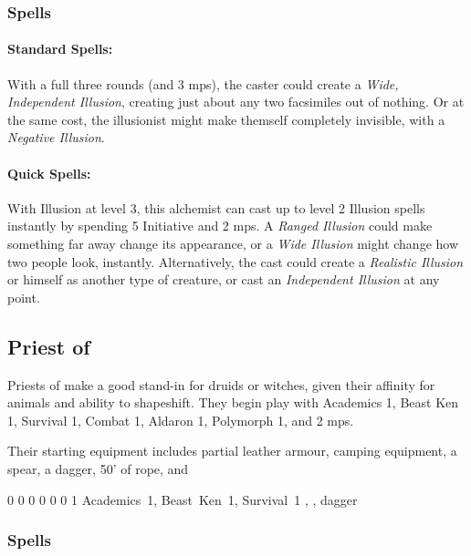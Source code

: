 {\begin{multicols}{2}
\subsubsection{Spells}
\paragraph{Standard Spells:}

With a full three rounds (and 3 \glspl{mp}), the caster could create a \textit{Wide, Independent Illusion}, creating just about any two facsimiles out of nothing.
Or at the same cost, the illusionist might make themself completely invisible, with a \textit{Negative Illusion}.

\paragraph{Quick Spells:}
With Illusion at level 3, this alchemist can cast up to level 2 Illusion spells instantly by spending 5 Initiative and 2 \glspl{mp}.
A \textit{Ranged Illusion} could make something far away change its appearance, or a \textit{Wide Illusion} might change how two people look, instantly.
Alternatively, the cast could create a \textit{Realistic Illusion} or himself as another type of creature, or cast an \textit{Independent Illusion} at any point.

\subsection{Priest of }

Priests of  make a good stand-in for druids or witches, given their affinity for animals and ability to shapeshift.
They begin play with Academics 1, Beast Ken 1, Survival 1, Combat 1, Aldaron 1, Polymorph 1, and 2 \glspl{mp}.

Their starting equipment includes partial leather armour, camping equipment, a spear, a dagger, 50' of rope, and 


{0}%
{0}%
{{0}%
{0}%
{0}}%
{0}%
{1}%
{Academics~1, Beast~Ken~1, Survival~1}%
{\spear, \partialleather, dagger}%
{}

\subsubsection{Spells}


\end{multicols}}

